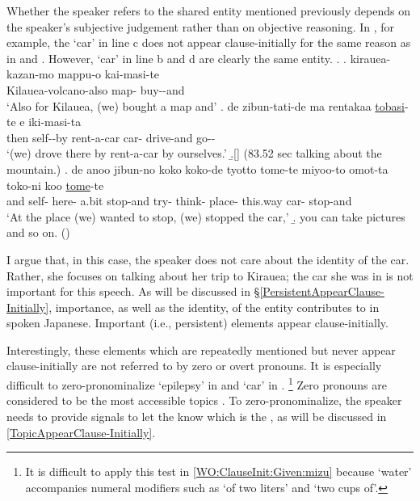 Whether the speaker refers to the shared entity mentioned previously
depends on the speaker's subjective judgement rather than on objective reasoning.
In \Next, for example,
the   `car' in line c does not appear clause-initially for the same reason as in \LLast and \Last.
However,  `car' in line b and d are clearly the same entity.
%
\ex.\label{WO:ClauseInit:Given:kuruma}
 \ag. kirauea-kazan-mo mappu-o kai-masi-te \\
 		Kilauea-volcano-also map- buy--and \\
		`Also for Kilauea, (we) bought a map and'
 \bg. de zibun-tati-de ma rentakaa  \ul{tobasi}-te e iki-masi-ta \\
 		then self--by  rent-a-car car- drive-and  go-- \\
		`(we) drove there by rent-a-car by ourselves.'
 \b.[] (83.52 sec talking about the mountain.)
 \bg. de anoo jibun-no koko koko-de tyotto tome-te miyoo-to omot-ta toko-ni koo  \ul{tome}-te \\
 		and  self-  here- a.bit stop-and try- think- place- this.way car- stop-and \\
	 	`At the place (we) wanted to stop, (we) stopped the car,'
 \b. you can take pictures and so on.
 \hfill{()}
%

I argue that, in this case, the speaker does not care about the identity of the car.
Rather, she focuses on talking about her trip to Kirauea;
the car she was in is not important for this speech.
As will be discussed in \S \ref{PersistentAppearClause-Initially},
importance, as well as the identity, of the entity contributes to  in spoken Japanese.
Important (i.e., persistent) elements appear clause-initially.

Interestingly,
these elements which are repeatedly mentioned but never appear clause-initially are not referred to by zero or overt pronouns.
It is especially difficult to zero-pronominalize  `epilepsy' in \LLast[b-f] and  `car' in \Last[d].%
 \footnote{
 It is difficult to apply this test in \ref{WO:ClauseInit:Given:mizu} because  `water' accompanies numeral modifiers such as 
 `of two liters' and `two cups of'.
 }
Zero pronouns are considered to be the most accessible topics \cite[17]{givon83}.
To zero-pronominalize,
the speaker needs to provide signals to let the  know which is the , as will be discussed in \ref{TopicAppearClause-Initially}.

